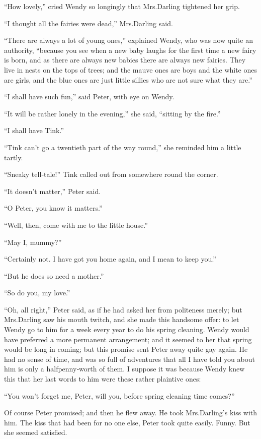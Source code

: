 “How lovely,” cried Wendy so longingly that Mrs.\@ Darling tightened her grip.

“I thought all the fairies were dead,” Mrs.\@ Darling said.

“There are always a lot of young ones,” explained Wendy, who was now quite an authority,
“because you see when a new baby laughs for the first time a new fairy is born,
and as there are always new babies there are always new fairies.
They live in nests on the tops of trees;
and the mauve ones are boys and the white ones are girls,
and the blue ones are just little sillies who are not sure what they are.”

“I shall have such fun,” said Peter, with eye on Wendy.

“It will be rather lonely in the evening,” she said, “sitting by the fire.”

“I shall have Tink.”

“Tink can’t go a twentieth part of the way round,” she reminded him a little tartly.

“Sneaky tell‐tale!\@” Tink called out from somewhere round the corner.

“It doesn’t matter,” Peter said.

“O Peter, you know it matters.”

“Well, then, come with me to the little house.”

“May I, mummy?”

“Certainly not.
I have got you home again, and I mean to keep you.”

“But he does so need a mother.”

“So do you, my love.”

“Oh, all right,” Peter said, as if he had asked her from politeness merely;
but Mrs.\@ Darling saw his mouth twitch, and she made this handsome offer:
to let Wendy go to him for a week every year to do his spring cleaning.
Wendy would have preferred a more permanent arrangement;
and it seemed to her that spring would be long in coming;
but this promise sent Peter away quite gay again.
He had no sense of time,
and was so full of adventures that all I have told you about him is only a halfpenny‐worth of them.
I suppose it was because Wendy knew this that her last words to him were these rather plaintive ones:

“You won’t forget me, Peter, will you,
before spring cleaning time comes?”

Of course Peter promised;
and then he flew away.
He took Mrs.\@ Darling’s kiss with him.
The kiss that had been for no one else, Peter took quite easily.
Funny.
But she seemed satisfied.

